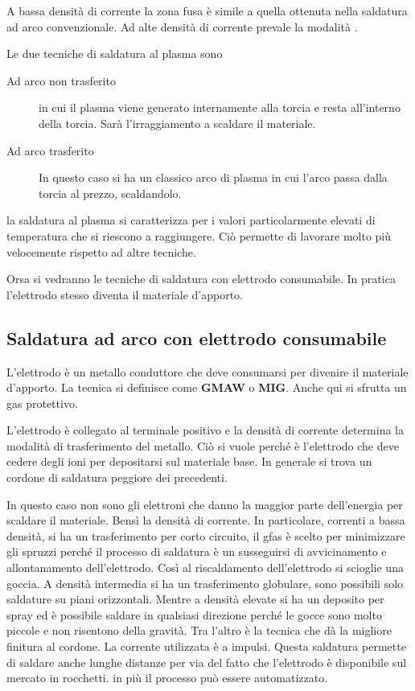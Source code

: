 A bassa densità di corrente la zona fusa è simile a quella ottenuta nella saldatura ad arco convenzionale.
Ad alte densità di corrente prevale la modalità .


Le due tecniche di saldatura al plasma sono
\begin{description}
\item[Ad arco non trasferito] in cui il plasma viene generato internamente alla torcia e resta all'interno della torcia. Sarà l'irraggiamento a scaldare il materiale.
\item[Ad arco trasferito] In questo caso si ha un classico arco di plasma in cui l'arco passa dalla torcia al prezzo, scaldandolo.
\end{description}


la saldatura al plasma si caratterizza per i valori particolarmente elevati di temperatura che si riescono a raggiungere. Ciò permette di lavorare molto più velocemente rispetto ad altre tecniche.

Orsa si vedranno le tecniche di saldatura con elettrodo consumabile.
In pratica l'elettrodo stesso diventa il materiale d'apporto.

\subsection{Saldatura ad arco con elettrodo consumabile}
L'elettrodo è un metallo conduttore che deve consumarsi per divenire il materiale d'apporto.
La tecnica si definisce come \textbf{GMAW} o \textbf{MIG}. 
Anche qui si sfrutta un gas protettivo.

L'elettrodo è collegato al terminale positivo e la densità di corrente determina la modalità di trasferimento del metallo.
Ciò si vuole perché è l'elettrodo che deve cedere degli ioni per depositarsi sul materiale base. In generale si trova un cordone di saldatura peggiore dei precedenti.

In questo caso non sono gli elettroni che danno la maggior parte dell'energia per scaldare il materiale. Bensì la densità di corrente.
In particolare, correnti a bassa densità, si ha un trasferimento per corto circuito, il gfas è scelto per minimizzare gli spruzzi perché il processo di saldatura è un susseguirsi di avvicinamento e allontanamento dell'elettrodo. Così al riscaldamento dell'elettrodo si scioglie una goccia.
A densità intermedia si ha un trasferimento globulare, sono possibili solo saldature su piani orizzontali.
Mentre a densità elevate si ha un deposito per spray ed è possibile saldare in qualsiasi direzione perché le gocce sono molto piccole e non risentono della gravità. Tra l'altro è la tecnica che dà la migliore finitura al cordone.
La corrente utilizzata è a impulsi.
Questa saldatura permette di saldare anche lunghe distanze per via del fatto che l'elettrodo è disponibile sul mercato in rocchetti.
in più il processo può essere automatizzato.

